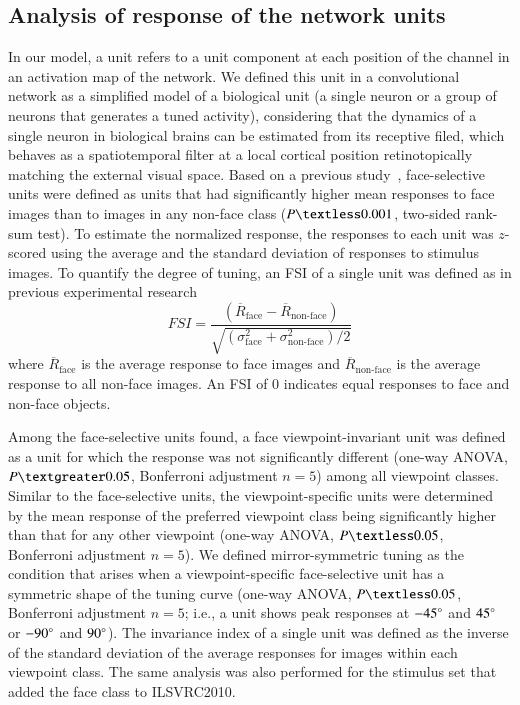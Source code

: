 \documentclass[final,3p,times,twocolumn]{elsarticle}
\begin{document}
\subsection{Analysis of response of the network units}
In our model, a unit refers to a unit component at each position of the channel in an activation map of the network.
We defined this unit in a convolutional network as a simplified model of a biological unit (a single neuron or a group of neurons that generates a tuned activity), considering that the dynamics of a single neuron in biological brains can be estimated from its receptive filed, 
which behaves as a spatiotemporal filter at a local cortical position retinotopically matching the external visual space.
Based on a previous study~\cite{grossman2019convergent}, face-selective units were defined as units that had significantly higher mean responses to face images than to images in any non-face class ($ P \textless 0.001 $, two-sided rank-sum test).
To estimate the normalized response, the responses to each unit was $ z $-scored using the average and the standard deviation of responses to stimulus images.
To quantify the degree of tuning, an FSI of a single unit was defined as in previous experimental research~\cite{aparicio2016neurophysiological}
\begin{equation}\label{eq:fsi}
	FSI = \frac{(\overline{R}_\textrm{face} - \overline{R}_\textrm{non-face})}
	{\sqrt{(\sigma^2_\textrm{face} + \sigma^2_\textrm{non-face}) / 2}}
\end{equation}
where $ \overline{R}_\textrm{face} $ is the average response to face images 
and $ \overline{R}_\textrm{non-face} $ is the average response to all non-face images.
An FSI of 0 indicates equal responses to face and non-face objects.


Among the face-selective units found, a face viewpoint-invariant unit was defined as a unit for which the response was not significantly different (one-way ANOVA, $ P \textgreater 0.05 $, Bonferroni adjustment $ n = 5 $) among all viewpoint classes.
Similar to the face-selective units, the viewpoint-specific units were determined by the mean response of the preferred viewpoint class being significantly higher than that for any other viewpoint (one-way ANOVA, $ P \textless 0.05 $, Bonferroni adjustment $ n = 5 $).
We defined mirror-symmetric tuning as the condition that arises when a viewpoint-specific face-selective unit has a symmetric shape of the tuning curve (one-way ANOVA, $ P \textless 0.05 $, Bonferroni adjustment $ n = 5 $; i.e., a unit shows peak responses at $ -45\degree $ and $ 45\degree $ or $ -90\degree $ and $ 90\degree $).
The invariance index of a single unit was defined as the inverse of the standard deviation of the average responses for images within each viewpoint class.
The same analysis was also performed for the stimulus set that added the face class to ILSVRC2010.
\end{document}
